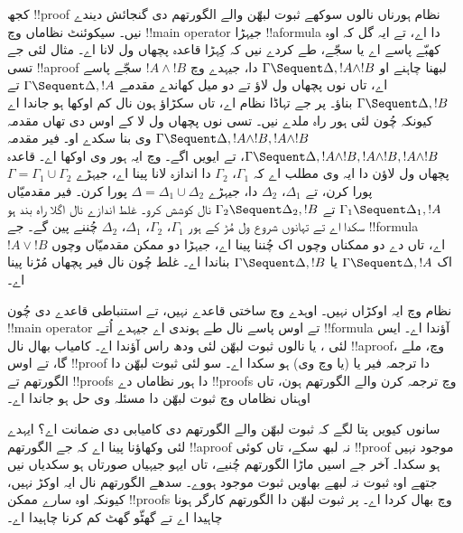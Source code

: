 \documentclass[../../../include/open-logic-section]{subfiles}
\begin{document}
کجھ !!{proof} نظام ہورناں نالوں سوکھے ثبوت لبھّن والے الگورتھم دی گنجائش دیندے نیں۔ سیکوئنٹ نظاماں وچ !!{main operator} جیہڑا !!a{formula} دا اے، تے ایہ گل کہ اوہ کھبّے پاسے اے یا سجّے، طے کردے نیں کہ کِہڑا قاعدہ پچھاں ول لانا اے۔ مثال لئی جے تسی !!a{proof} لبھنا چاہنے او $\Gamma \Sequent \Delta, !A \land !B$ دا، جیہدے وچ $!A \land
!B$ سجّے پاسے اے، تاں \RightR{\land} نوں پچھاں ول لاؤ تے دو میل کھاندے مقدمے $ \Gamma \Sequent \Delta, !A$ تے $ \Gamma \Sequent \Delta, !B$ بناؤ۔ پر جے تہاڈا نظام  اے، تاں سکڑاؤ ہون نال کم اوکھا ہو جاندا اے کیونکہ چُون لئی ہور راہ ملدے نیں۔ تسی \RightR{\Contraction} نوں پچھاں ول لا کے اوس دی تھاں مقدمہ $ \Gamma \Sequent \Delta, !A \land
!B, !A \land !B$ وی بنا سکدے او۔ فیر مقدمہ $ \Gamma \Sequent
\Delta, !A \land !B, !A \land !B, !A \land !B$، تے ایویں اگے۔  وچ ایہ ہور وی اوکھا اے۔ قاعدہ \RightR{\land} پچھاں ول لاؤن دا ایہ وی مطلب اے کہ $ \Gamma_1$، $ \Gamma_2$ دا اندازہ لانا پینا اے، جیہڑے $ \Gamma
= \Gamma_1 \cup \Gamma_2$ پورا کرن، تے $ \Delta_1$، $ \Delta_2$ دا، جیہڑے $ \Delta
= \Delta_1 \cup \Delta_2$ پورا کرن۔ فیر مقدمیّاں $ \Gamma_1 \Sequent \Delta_1, !A$ تے $ \Gamma_2 \Sequent \Delta_2, !B$ نال کوشش کرو۔ غلط اندازے نال اگلا راہ بند ہو سکدا اے تے تہانوں شروع ول مُڑ کے ہور $ \Gamma_1$، $ \Gamma_2$، $ \Delta_1$، $ \Delta_2$ چُننے پین گے۔ جے !!{formula} $!A \lor !B$ اے، تاں \RightR{\lor} دے دو ممکناں وچوں اک چُننا پینا اے، جیہڑا دو ممکن مقدمیّاں وچوں اک $ \Gamma \Sequent \Delta,
!A$ یا $ \Gamma \Sequent \Delta, !B$ بناندا اے۔ غلط چُون نال فیر پچھاں مُڑنا پینا اے۔

 نظام وچ ایہ اوکڑاں نہیں۔ اوہدے وچ ساختی قاعدے نہیں، تے استنباطی قاعدے دی چُون !!{main operator} تے اوس پاسے نال طے ہوندی اے جیہدے اُتے !!{formula} آؤندا اے۔ ایس لئی ،  یا  نالوں ثبوت لبھّن لئی ودھ راس آؤندا اے۔ کامیاب بھال نال !!a{proof}،  وچ، ملے گا، تے اوس !!{proof} دا ترجمہ فیر  یا  (یا  وچ وی) ہو سکدا اے۔ سو  لئی ثبوت لبھّن دا الگورتھم تے  !!{proof}s دا ہور نظاماں دے !!{proof}s وچ ترجمہ کرن والے الگورتھم ہون، تاں اوہناں نظاماں وچ ثبوت لبھّن دا مسئلہ وی حل ہو جاندا اے۔

سانوں کیویں پتا لگے کہ ثبوت لبھّن والے الگورتھم دی کامیابی دی ضمانت اے؟ ایہدے لئی وکھاؤنا پینا اے کہ جے الگورتھم !!a{proof} نہ لبھ سکے، تاں کوئی !!{proof} موجود نہیں ہو سکدا۔ آخر جے اسیں ماڑا الگورتھم چُنیے، تاں ایہو جیہیاں صورتاں ہو سکدیاں نیں جتھے اوہ ثبوت نہ لبھے بھاویں ثبوت موجود ہووے۔ سدھے الگورتھم نال ایہ اوکڑ نہیں، کیونکہ اوہ سارے ممکن !!{proof}s وچ بھال کردا اے۔ پر ثبوت لبھّن دا الگورتھم کارگر ہونا چاہیدا اے تے گھٹّو گھٹ کم کرنا چاہیدا اے۔
\end{document}

